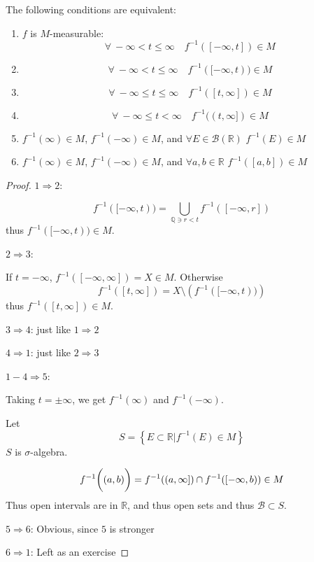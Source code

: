 \begin{prop}
	The following conditions are equivalent:
	\begin{enumerate}
		\item $f$ is $M$-measurable: $$\forall  \: -\infty < t \leq \infty \quad f^{-1}([-\infty, t]) \in M$$
		\item $$\forall  \: -\infty < t \leq \infty \quad f^{-1}([-\infty, t)) \in M$$
		\item $$\forall  \: -\infty \leq t \leq \infty \quad f^{-1}([t, \infty]) \in M$$
		\item $$\forall  \: -\infty \leq t < \infty \quad f^{-1}((t, \infty]) \in M$$
		\item $f^{-1}(\infty) \in M$, $f^{-1}(-\infty) \in M$, and $\forall E\in \mathcal{B}(\mathbb{R})$ $f^{-1}(E) \in M$
		\item $f^{-1}(\infty) \in M$, $f^{-1}(-\infty) \in M$, and $\forall a,b \in \mathbb{R}$ $f^{-1}([a,b]) \in M$
	\end{enumerate}

\begin{proof}
	$1\Rightarrow 2$:
	
	$$f^{-1}([-\infty, t)) = \bigcup_{\mathbb{Q} \ni r <t} f^{-1} ([-\infty, r])$$
	thus $f^{-1}([-\infty, t)) \in M$.
	
	$2\Rightarrow 3$:
	
	If $t=-\infty$, $f^{-1}([-\infty, \infty]) = X \in M$. Otherwise
	$$f^{-1}([t, \infty]) = X \setminus \left(f^{-1}([-\infty, t))\right) $$
	thus $f^{-1}([t, \infty]) \in M$.
	
	$3\Rightarrow 4$: just like $1\Rightarrow 2$
	
	
	$4\Rightarrow 1$: just like $2\Rightarrow 3$
	
	$1-4 \Rightarrow 5$:
	
	Taking $t=\pm \infty$, we get $f^{-1}(\infty)$ and $f^{-1}(-\infty)$. 
	
	Let 
	$$S = \left\{ E\subset \mathbb{R} | f^{-1}(E)\in M \right\}$$
	$S$ is $\sigma$-algebra.
	
	$$f^{-1} \qty\bigg((a,b)) = f^{-1}((a,\infty]) \cap f^{-1} ([-\infty, b)) \in M$$
	Thus open intervals are in $\mathbb{R}$, and thus open sets and thus $\mathcal{B}\subset S$.
	
	
	$5 \Rightarrow 6$: Obvious, since $5$ is stronger
	
	
	$6 \Rightarrow 1$: Left as an exercise
\end{proof}
\end{prop}